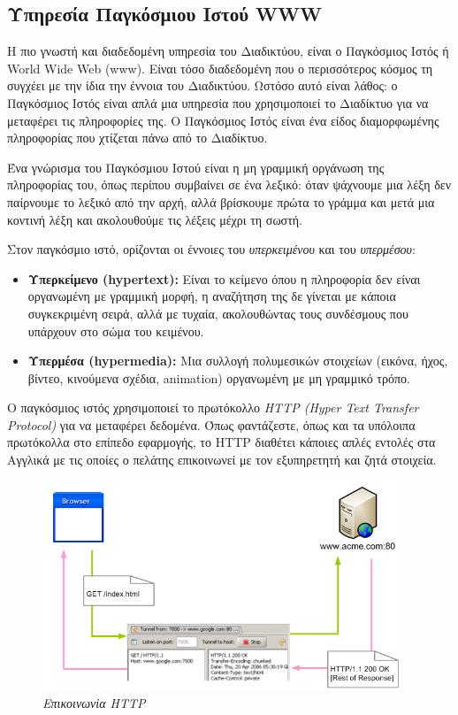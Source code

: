 %
%

\subsection{Υπηρεσία Παγκόσμιου Ιστού WWW}

Η πιο γνωστή και διαδεδομένη υπηρεσία του Διαδικτύου, είναι ο Παγκόσμιος Ιστός ή World Wide Web (www). Είναι τόσο διαδεδομένη που ο περισσότερος κόσμος τη συγχέει με την ίδια την έννοια του Διαδικτύου. Ωστόσο αυτό είναι λάθος: ο Παγκόσμιος Ιστός είναι απλά μια υπηρεσία που χρησιμοποιεί το Διαδίκτυο για να μεταφέρει τις πληροφορίες της. Ο Παγκόσμιος Ιστός είναι ένα είδος διαμορφωμένης πληροφορίας που χτίζεται πάνω από το Διαδίκτυο.

Ένα γνώρισμα του Παγκόσμιου Ιστού είναι η μη γραμμική οργάνωση της πληροφορίας του, όπως περίπου συμβαίνει σε ένα λεξικό: όταν ψάχνουμε μια λέξη δεν παίρνουμε το λεξικό από την αρχή, αλλά βρίσκουμε πρώτα το γράμμα και μετά μια κοντινή λέξη και ακολουθούμε τις λέξεις μέχρι τη σωστή.

Στον παγκόσμιο ιστό, ορίζονται οι έννοιες του \emph{υπερκειμένου} και του \emph{υπερμέσου}:

\begin{itemize}
\item \textbf{Υπερκείμενο (hypertext):} Είναι το κείμενο όπου  η πληροφορία δεν είναι οργανωμένη με γραμμική μορφή, η αναζήτηση της δε γίνεται με κάποια συγκεκριμένη σειρά, αλλά με τυχαία, ακολουθώντας τους συνδέσμους που υπάρχουν στο σώμα του κειμένου.
\item \textbf{Υπερμέσα (hypermedia):} Μια συλλογή πολυμεσικών στοιχείων (εικόνα, ήχος, βίντεο, κινούμενα σχέδια, animation) οργανωμένη με μη γραμμικό τρόπο.
\end{itemize}

Ο παγκόσμιος ιστός χρησιμοποιεί το πρωτόκολλο \emph{HTTP (Hyper Text Transfer Protocol)} για να μεταφέρει δεδομένα. Όπως φαντάζεστε, όπως και τα υπόλοιπα πρωτόκολλα στο επίπεδο εφαρμογής, το HTTP διαθέτει κάποιες απλές εντολές στα Αγγλικά με τις οποίες ο πελάτης επικοινωνεί με τον εξυπηρετητή και ζητά στοιχεία.

\begin{figure}[!ht]
 \centering
 \includegraphics[width=0.95\textwidth]{images/chapter6/6-11}
 \caption {\textsl{Επικοινωνία HTTP}}
 \label{6-11}
\end{figure}

